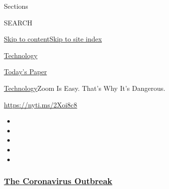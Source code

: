 Sections

SEARCH

\protect\hyperlink{site-content}{Skip to
content}\protect\hyperlink{site-index}{Skip to site index}

\href{https://www.nytimes3xbfgragh.onion/section/technology}{Technology}

\href{https://myaccount.nytimes3xbfgragh.onion/auth/login?response_type=cookie\&client_id=vi}{}

\href{https://www.nytimes3xbfgragh.onion/section/todayspaper}{Today's
Paper}

\href{/section/technology}{Technology}\textbar{}Zoom Is Easy. That's Why
It's Dangerous.

\url{https://nyti.ms/2Xoi8c8}

\begin{itemize}
\item
\item
\item
\item
\item
\end{itemize}

\hypertarget{the-coronavirus-outbreak}{%
\subsubsection{\texorpdfstring{\href{https://www.nytimes3xbfgragh.onion/news-event/coronavirus?name=styln-coronavirus-markets\&region=TOP_BANNER\&variant=undefined\&block=storyline_menu_recirc\&action=click\&pgtype=Article\&impression_id=a068a820-e39f-11ea-9027-41a96f0fd4e9}{The
Coronavirus
Outbreak}}{The Coronavirus Outbreak}}\label{the-coronavirus-outbreak}}

